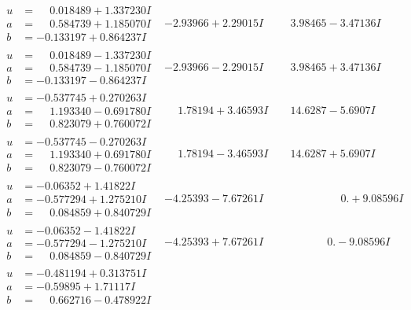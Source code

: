 \documentclass[1p]{elsarticle_modified}
\theoremstyle{definition}
\begin{document}
$$\begin{array}{c|c|c}
\begin{aligned}
u &= \phantom{-}0.018489 + 1.337230 I \\
a &= \phantom{-}0.584739 + 1.185070 I \\
b &= -0.133197 + 0.864237 I\end{aligned}
 & -2.93966 + 2.29015 I & \phantom{-}3.98465 - 3.47136 I \\ \hline\begin{aligned}
u &= \phantom{-}0.018489 - 1.337230 I \\
a &= \phantom{-}0.584739 - 1.185070 I \\
b &= -0.133197 - 0.864237 I\end{aligned}
 & -2.93966 - 2.29015 I & \phantom{-}3.98465 + 3.47136 I \\ \hline\begin{aligned}
u &= -0.537745 + 0.270263 I \\
a &= \phantom{-}1.193340 - 0.691780 I \\
b &= \phantom{-}0.823079 + 0.760072 I\end{aligned}
 & \phantom{-}1.78194 + 3.46593 I & \phantom{-}14.6287 - 5.6907 I \\ \hline\begin{aligned}
u &= -0.537745 - 0.270263 I \\
a &= \phantom{-}1.193340 + 0.691780 I \\
b &= \phantom{-}0.823079 - 0.760072 I\end{aligned}
 & \phantom{-}1.78194 - 3.46593 I & \phantom{-}14.6287 + 5.6907 I \\ \hline\begin{aligned}
u &= -0.06352 + 1.41822 I \\
a &= -0.577294 + 1.275210 I \\
b &= \phantom{-}0.084859 + 0.840729 I\end{aligned}
 & -4.25393 - 7.67261 I & \phantom{-0.000000 -}0. + 9.08596 I \\ \hline\begin{aligned}
u &= -0.06352 - 1.41822 I \\
a &= -0.577294 - 1.275210 I \\
b &= \phantom{-}0.084859 - 0.840729 I\end{aligned}
 & -4.25393 + 7.67261 I & \phantom{-0.000000 } 0. - 9.08596 I \\ \hline\begin{aligned}
u &= -0.481194 + 0.313751 I \\
a &= -0.59895 + 1.71117 I \\
b &= \phantom{-}0.662716 - 0.478922 I\end{aligned}

\end{array}$$
\end{document}
